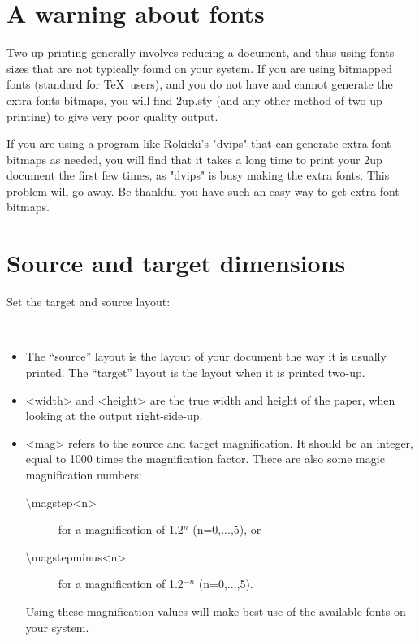 \documentclass[12pt]{article}
\begin{document}
\section{A warning about fonts}

Two-up printing generally involves reducing a document, and thus using fonts
sizes that are not typically found on your system. If you are using bitmapped
fonts (standard for \TeX\ users), and you do not have and cannot generate the
extra fonts bitmaps, you will find 2up.sty (and any other method of two-up
printing) to give very poor quality output.

If you are using a program like Rokicki's "dvips" that can generate extra font
bitmaps as needed, you will find that it takes a long time to print your 2up
document the first few times, as "dvips" is busy making the extra fonts. This
problem will go away. Be thankful you have such an easy way to get extra font
bitmaps.

\section{Source and target dimensions}

Set the target and source layout:
\begin{MD}
  \\
\end{MD}

\begin{itemize}
\item The ``source'' layout is the layout of your document
the way it is usually printed.  The ``target'' layout is the layout when it
is printed two-up.

\item <width> and <height> are the true width and height of the paper,
when looking at the output right-side-up.

\item <mag> refers to the source and target magnification. It should be an
integer, equal to 1000 times the magnification factor. There are also some
magic magnification numbers:
\begin{description}
\item[$\setminus$magstep<n>] for a magnification of 1.2$^n$ (n=0,...,5), or

\item[$\setminus$magstepminus<n>] for a magnification of 1.2$^{-n}$
(n=0,...,5).
\end{description}
Using these magnification values will make best use of the available fonts on
your system.
\end{itemize}
\end{document}
